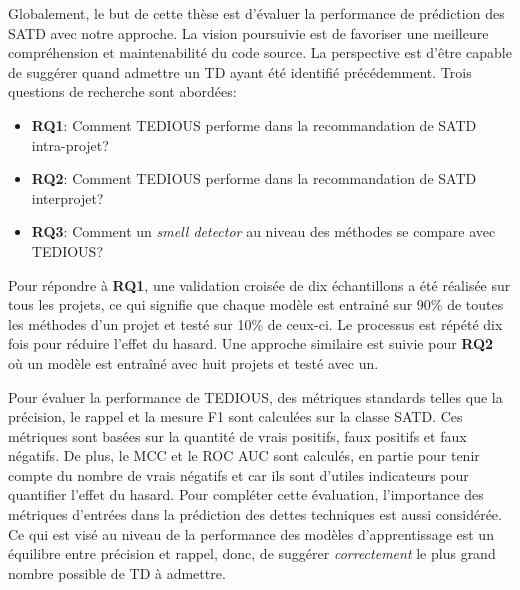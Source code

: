 Globalement, le but de cette th\`{e}se est d'\'{e}valuer la performance de pr\'{e}diction des \ac{SATD} avec notre approche. La vision poursuivie est de favoriser une meilleure compr\'{e}hension et maintenabilit\'{e} du code source. La perspective est d'\^{e}tre capable de sugg\'{e}rer quand admettre un \ac{TD} ayant \'{e}t\'{e} identifi\'{e} pr\'{e}c\'{e}demment. Trois questions de recherche sont abord\'{e}es: \par

\begin{itemize}
	\item \textbf{RQ1}: Comment \ac{TEDIOUS} performe dans la recommandation de \ac{SATD} intra-projet? 
	\item \textbf{RQ2}: Comment \ac{TEDIOUS} performe dans la recommandation de \ac{SATD} interprojet?
	\item \textbf{RQ3}: Comment un \emph{smell detector} au niveau des m\'{e}thodes se compare avec \ac{TEDIOUS}?
\end{itemize}

Pour r\'{e}pondre \`{a} \textbf{RQ1}, une validation crois\'{e}e de dix \'{e}chantillons a \'{e}t\'{e} r\'{e}alis\'{e}e sur tous les projets, ce qui signifie que chaque mod\`{e}le est entrain\'{e} sur 90\% de toutes les m\'{e}thodes d'un projet et test\'{e} sur 10\% de ceux-ci.  Le processus est r\'{e}p\'{e}t\'{e} dix fois pour r\'{e}duire l'effet du hasard. Une approche similaire est suivie pour \textbf{RQ2} o\`{u} un mod\`{e}le est entra\^{i}n\'{e} avec huit projets et test\'{e} avec un. \par

Pour \'{e}valuer la performance de \ac{TEDIOUS}, des m\'{e}triques standards telles que la pr\'{e}cision, le rappel et la mesure F1 sont calcul\'{e}es sur la classe \ac{SATD}. Ces m\'{e}triques sont bas\'{e}es sur la quantit\'{e} de vrais positifs, faux positifs et faux n\'{e}gatifs. De plus, le \ac{MCC} et le \ac{ROC} \ac{AUC} sont calcul\'{e}s, en partie pour tenir compte du nombre de vrais n\'{e}gatifs et car ils sont d'utiles indicateurs pour quantifier l'effet du hasard. Pour compl\'{e}ter cette \'{e}valuation, l'importance des m\'{e}triques d'entr\'{e}es dans la pr\'{e}diction des dettes techniques est aussi consid\'{e}r\'{e}e. Ce qui est vis\'{e} au niveau de la performance des mod\`{e}les d'apprentissage est un \'{e}quilibre entre pr\'{e}cision et rappel, donc, de sugg\'{e}rer \emph{correctement} le plus grand nombre possible de \ac{TD} \`{a} admettre. \par

